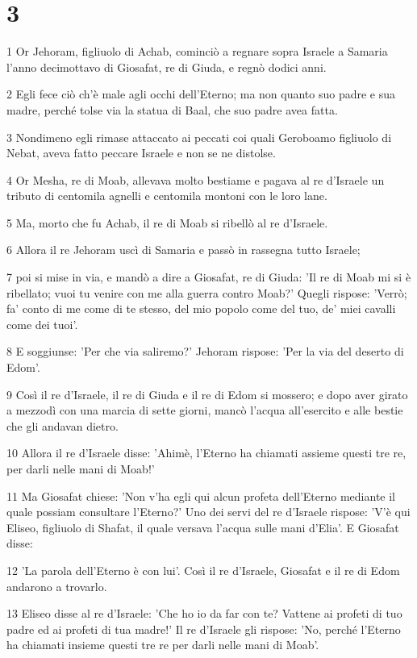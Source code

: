 \chapter{3}

\par 1 Or Jehoram, figliuolo di Achab, cominciò a regnare sopra Israele a Samaria l'anno decimottavo di Giosafat, re di Giuda, e regnò dodici anni.
\par 2 Egli fece ciò ch'è male agli occhi dell'Eterno; ma non quanto suo padre e sua madre, perché tolse via la statua di Baal, che suo padre avea fatta.
\par 3 Nondimeno egli rimase attaccato ai peccati coi quali Geroboamo figliuolo di Nebat, aveva fatto peccare Israele e non se ne distolse.
\par 4 Or Mesha, re di Moab, allevava molto bestiame e pagava al re d'Israele un tributo di centomila agnelli e centomila montoni con le loro lane.
\par 5 Ma, morto che fu Achab, il re di Moab si ribellò al re d'Israele.
\par 6 Allora il re Jehoram uscì di Samaria e passò in rassegna tutto Israele;
\par 7 poi si mise in via, e mandò a dire a Giosafat, re di Giuda: 'Il re di Moab mi si è ribellato; vuoi tu venire con me alla guerra contro Moab?' Quegli rispose: 'Verrò; fa' conto di me come di te stesso, del mio popolo come del tuo, de' miei cavalli come dei tuoi'.
\par 8 E soggiunse: 'Per che via saliremo?' Jehoram rispose: 'Per la via del deserto di Edom'.
\par 9 Così il re d'Israele, il re di Giuda e il re di Edom si mossero; e dopo aver girato a mezzodì con una marcia di sette giorni, mancò l'acqua all'esercito e alle bestie che gli andavan dietro.
\par 10 Allora il re d'Israele disse: 'Ahimè, l'Eterno ha chiamati assieme questi tre re, per darli nelle mani di Moab!'
\par 11 Ma Giosafat chiese: 'Non v'ha egli qui alcun profeta dell'Eterno mediante il quale possiam consultare l'Eterno?' Uno dei servi del re d'Israele rispose: 'V'è qui Eliseo, figliuolo di Shafat, il quale versava l'acqua sulle mani d'Elia'. E Giosafat disse:
\par 12 'La parola dell'Eterno è con lui'. Così il re d'Israele, Giosafat e il re di Edom andarono a trovarlo.
\par 13 Eliseo disse al re d'Israele: 'Che ho io da far con te? Vattene ai profeti di tuo padre ed ai profeti di tua madre!' Il re d'Israele gli rispose: 'No, perché l'Eterno ha chiamati insieme questi tre re per darli nelle mani di Moab'.
